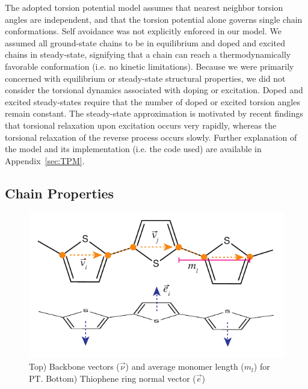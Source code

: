 The adopted torsion potential model assumes that nearest neighbor torsion angles are independent, and that the torsion potential alone governs single chain conformations. Self avoidance was not explicitly enforced in our model. We assumed all ground-state chains to be in equilibrium and doped and excited chains in steady-state, signifying that a chain can reach a thermodynamically favorable conformation (i.e. no kinetic limitations). Because we were primarily concerned with equilibrium or steady-state structural properties, we did not consider the torsional dynamics associated with doping or excitation. Doped and excited steady-states require that the number of doped or excited torsion angles remain constant. The steady-state approximation is motivated by recent findings that torsional relaxation upon excitation occurs very rapidly, whereas the torsional relaxation of the reverse process occurs slowly.\cite{Busby2011, Yu2016} Further explanation of the model and its implementation (i.e. the code used) are available in Appendix~\ref{sec:TPM}.

\subsection{Chain Properties}

\begin{figure}
    \centering
    \includegraphics{figures/chap2/bond_vectors.pdf}
    \caption{Top) Backbone vectors ($\Vec{\nu}$) and average monomer length ($m_l$) for PT. Bottom) Thiophene ring normal vector ($\Vec{e}$)}
    \label{fig:pt_vecs}
\end{figure}

